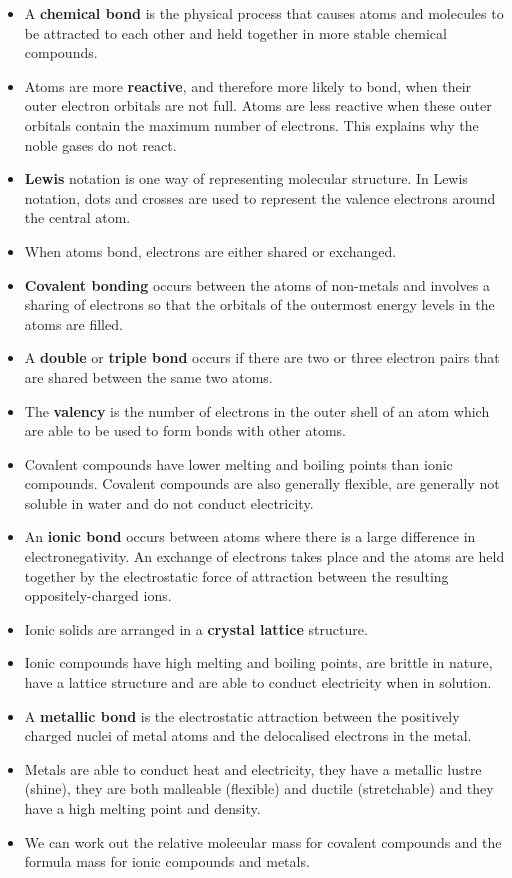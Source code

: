 \begin{itemize}[noitemsep]
\item A \textbf{chemical bond} is the physical process that causes atoms and molecules to be attracted to each other and held together in more stable chemical compounds.
\item Atoms are more \textbf{reactive}, and therefore more likely to bond, when their outer electron orbitals are not full. Atoms are less reactive when these outer orbitals contain the maximum number of electrons. This explains why the noble gases do not react.
\item \textbf{Lewis} notation is one way of representing molecular structure. In Lewis notation, dots and crosses are used to represent the valence electrons around the central atom.
\item When atoms bond, electrons are either shared or exchanged.
\item \textbf{Covalent bonding} occurs between the atoms of non-metals and involves a sharing of electrons so that the orbitals of the outermost energy levels in the atoms are filled.
\item A \textbf{double} or \textbf{triple bond} occurs if there are two or three electron pairs that are shared between the same two atoms.
\item The \textbf{valency} is the number of electrons in the outer shell of an atom which are able to be used to form bonds with other atoms.
\item Covalent compounds have lower melting and boiling points than ionic compounds. Covalent compounds are also generally flexible, are generally not soluble in water and do not conduct electricity.
\item An \textbf{ionic bond} occurs between atoms where there is a large difference in electronegativity. An exchange of electrons takes place and the atoms are held together by the electrostatic force of attraction between the resulting oppositely-charged ions.
\label{m38689*uid151}\item Ionic solids are arranged in a \textbf{crystal lattice} structure.
\label{m38689*uid152}\item Ionic compounds have high melting and boiling points, are brittle in nature, have a lattice structure and are able to conduct electricity when in solution.
\label{m38689*uid153}\item A \textbf{metallic bond} is the electrostatic attraction between the positively charged nuclei of metal atoms and the delocalised electrons in the metal.
\label{m38689*uid154}\item Metals are able to conduct heat and electricity, they have a metallic lustre (shine), they are both malleable (flexible) and ductile (stretchable) and they have a high melting point and density.
\item We can work out the relative molecular mass for covalent compounds and the formula mass for ionic compounds and metals.
\end{itemize}
